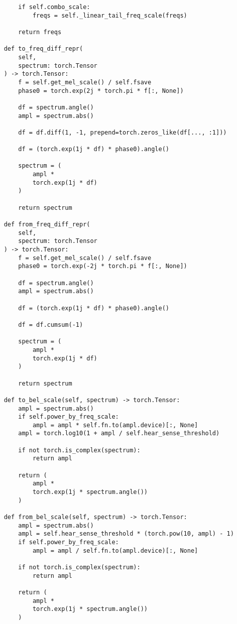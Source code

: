 \begin{verbatim}
        if self.combo_scale:
            freqs = self._linear_tail_freq_scale(freqs)

        return freqs

    def to_freq_diff_repr(
        self, 
        spectrum: torch.Tensor
    ) -> torch.Tensor:
        f = self.get_mel_scale() / self.fsave
        phase0 = torch.exp(2j * torch.pi * f[:, None])

        df = spectrum.angle()
        ampl = spectrum.abs()

        df = df.diff(1, -1, prepend=torch.zeros_like(df[..., :1]))

        df = (torch.exp(1j * df) * phase0).angle()

        spectrum = (
            ampl *
            torch.exp(1j * df)
        )

        return spectrum

    def from_freq_diff_repr(
        self, 
        spectrum: torch.Tensor
    ) -> torch.Tensor:
        f = self.get_mel_scale() / self.fsave
        phase0 = torch.exp(-2j * torch.pi * f[:, None])

        df = spectrum.angle()
        ampl = spectrum.abs()

        df = (torch.exp(1j * df) * phase0).angle()

        df = df.cumsum(-1)

        spectrum = (
            ampl *
            torch.exp(1j * df)
        )

        return spectrum

    def to_bel_scale(self, spectrum) -> torch.Tensor:
        ampl = spectrum.abs()
        if self.power_by_freq_scale:
            ampl = ampl * self.fn.to(ampl.device)[:, None]
        ampl = torch.log10(1 + ampl / self.hear_sense_threshold)

        if not torch.is_complex(spectrum):
            return ampl
        
        return (
            ampl *
            torch.exp(1j * spectrum.angle())
        )

    def from_bel_scale(self, spectrum) -> torch.Tensor:
        ampl = spectrum.abs()
        ampl = self.hear_sense_threshold * (torch.pow(10, ampl) - 1)
        if self.power_by_freq_scale:
            ampl = ampl / self.fn.to(ampl.device)[:, None]

        if not torch.is_complex(spectrum):
            return ampl

        return (
            ampl *
            torch.exp(1j * spectrum.angle())
        )
    

\end{verbatim}
